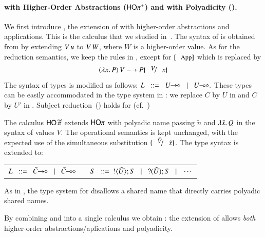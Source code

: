 \documentclass[runningheads]{llncs}
\begin{document}
{\paragraph{\HOp with Higher-Order Abstractions ($\mathsf{HO\pi^{+}}$) and 
with Polyadicity (\PHOp).
}
We first introduce \HOpp, the  extension of \HOp with higher-order abstractions and applications.
This is the calculus that we studied in~\cite{characteristic_bis}. The syntax of \HOpp is obtained 
from   by extending
$V\, {u}$ to $V\, {W}$, where  $W$ is a higher-order value. 
As for the reduction semantics, we keep the rules in , except for 
 $\orule{App}$ which is replaced by 
$$
	\appl{(\abs{x}{P})}{V} \red P \subst{V}{x}
$$
The syntax of types is modified as follows: %
$
		L \bnfis \shot{U} \bnfbar \lhot{U}.
$
These types can be easily accommodated in the type system 
in :
we replace $C$ by $U$ in  and $C$ by $U'$ in . Subject
reduction~() holds for \HOpp (cf.~\cite{characteristic_bis})

%
The calculus  
$\mathsf{HO}\,{\widetilde{\pi}}$ 
extends $\mathsf{HO}\pi$ 
with polyadic name passing $\tilde{n}$ and $\lambda \tilde{x}.\,Q$ in the syntax 
of values $V$. 
The operational semantics is kept unchanged, with the expected use of the simultaneous substitution $\subst{\tilde{V}}{\tilde{x}}$.
The type syntax is extended to: 
%
\begin{center}
	\begin{tabular}{c}
	$	L \bnfis \shot{\tilde{C}} \bnfbar \lhot{\tilde{C}}
		\quad\quad
		S \bnfis  \btout{\tilde{U}} S \bnfbar \btinp{\tilde{U}} S \bnfbar \cdots$
	\end{tabular}
\end{center}
%
As in \cite{tlca07,MostrousY15},
the type system for \PHOp 
disallows a shared name that directly carries polyadic
shared names.

By combining \HOpp and \PHOp into a single calculus we obtain \PHOpp:
the extension of \HOp allows \emph{both} higher-order
abstractions/aplications and polyadicity.


}
\end{document}
